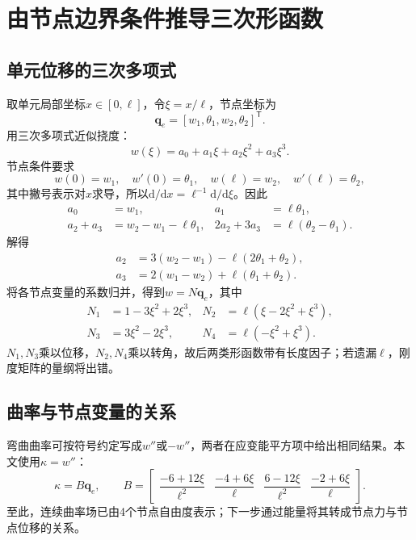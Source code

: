 \documentclass[UTF8,a4paper,11pt,fontset=fandol]{ctexart}
\numberwithin{equation}{section}
\newcommand{\dd}{\mathrm d}
\newcommand{\T}{^{\mathsf T}}
\begin{document}
\newpage
\section{由节点边界条件推导三次形函数}
\subsection{单元位移的三次多项式}
取单元局部坐标$x\in[0,\ell]$，令$\xi=x/\ell$，节点坐标为
\begin{equation}\bm q_e=[w_1,\theta_1,w_2,\theta_2]\T.\end{equation}
用三次多项式近似挠度：
\begin{equation}w(\xi)=a_0+a_1\xi+a_2\xi^2+a_3\xi^3.\end{equation}
节点条件要求
\begin{equation}
w(0)=w_1,\quad w'(0)=\theta_1,\quad
w(\ell)=w_2,\quad w'(\ell)=\theta_2,
\end{equation}
其中撇号表示对$x$求导，所以$\dd/\dd x=\ell^{-1}\dd/\dd\xi$。因此
\begin{align}
a_0&=w_1,&a_1&=\ell\theta_1,\\
a_2+a_3&=w_2-w_1-\ell\theta_1,&
2a_2+3a_3&=\ell(\theta_2-\theta_1).
\end{align}
解得
\begin{align}
a_2&=3(w_2-w_1)-\ell(2\theta_1+\theta_2),\\
a_3&=2(w_1-w_2)+\ell(\theta_1+\theta_2).
\end{align}
将各节点变量的系数归并，得到$w=N\bm q_e$，其中
\begin{align}
N_1&=1-3\xi^2+2\xi^3,&N_2&=\ell(\xi-2\xi^2+\xi^3),\\
N_3&=3\xi^2-2\xi^3,&N_4&=\ell(-\xi^2+\xi^3).
\end{align}
$N_1,N_3$乘以位移，$N_2,N_4$乘以转角，故后两类形函数带有长度因子；若遗漏$\ell$，刚度矩阵的量纲将出错。
\subsection{曲率与节点变量的关系}
弯曲曲率可按符号约定写成$w''$或$-w''$，两者在应变能平方项中给出相同结果。本文使用$\kappa=w''$：
\begin{equation}
\kappa=B\bm q_e,\qquad
B=\begin{bmatrix}
\dfrac{-6+12\xi}{\ell^2}&
\dfrac{-4+6\xi}{\ell}&
\dfrac{6-12\xi}{\ell^2}&
\dfrac{-2+6\xi}{\ell}
\end{bmatrix}.
\end{equation}
至此，连续曲率场已由4个节点自由度表示；下一步通过能量将其转成节点力与节点位移的关系。
\end{document}
